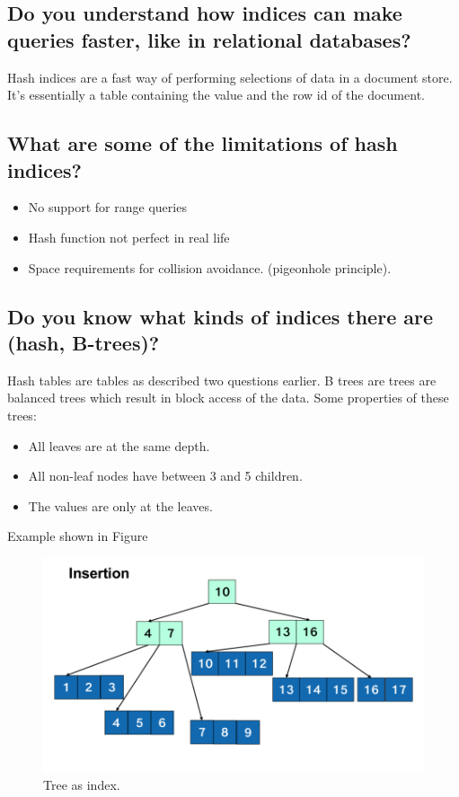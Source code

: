 \documentclass{article}
\begin{document}
\subsection{Do you understand how indices can make queries faster, like in relational databases?}

Hash indices are a fast way of performing selections of data in a document store. It's essentially a table containing the value and the row id of the document.

\subsection{What are some of the limitations of hash indices?}

\begin{itemize}
\item No support for range queries
\item Hash function not perfect in real life
\item Space requirements for collision avoidance. (pigeonhole principle).
\end{itemize}

\subsection{Do you know what kinds of indices there are (hash, B-trees)?}

Hash tables are tables as described two questions earlier. B trees are trees are balanced trees which result in block access of the data. Some properties of these trees:
\begin{itemize}
\item All leaves are at the same depth.
\item All non-leaf nodes have between 3 and 5 children.
\item The values are only at the leaves.
\end{itemize}

Example shown in Figure

\begin{figure}
  \centering
  \includegraphics[width=.7\textwidth]{img/index_tree.png}
  \caption{Tree as index.}
  \label{fig:tree}
\end{figure}
\end{document}
